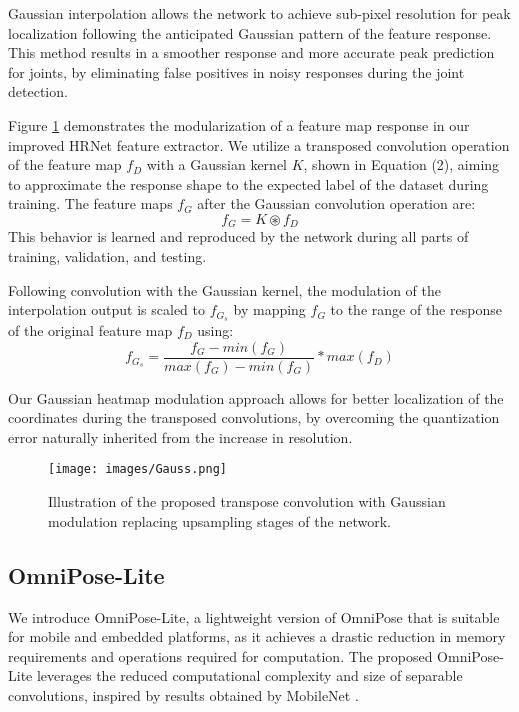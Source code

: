 \documentclass[10pt,twocolumn,letterpaper]{article}
\begin{document}
Gaussian interpolation allows the network to achieve sub-pixel resolution for peak localization following the anticipated Gaussian pattern of the feature response.
This method results in a smoother response and more accurate peak prediction for joints, by eliminating false positives in noisy responses during the joint detection.

Figure \ref{fig:Gauss} demonstrates the modularization of a feature map response in our improved HRNet feature extractor.
We utilize a transposed convolution operation of the feature map $f_D$ with a Gaussian kernel $K$, shown in Equation (2), aiming to approximate the response shape to the expected label of the dataset during training.
The feature maps $f_G$ after the Gaussian convolution operation are:
\begin{equation}
    f_G = K \circledast f_D
\end{equation}
\label{convOperation}
\noindent 
This behavior is learned and reproduced by the network during all parts of training, validation, and testing.

Following convolution with the Gaussian kernel, the modulation of the interpolation output is scaled to $f_{G_s}$ by mapping $f_{G}$ to the range of the response of the original feature map $f_{D}$ using:
\begin{equation}
    f_{G_s} = \frac{f_G - min(f_G)}{max(f_G) - min(f_G)}*max(f_D)
\end{equation}
\noindent 

Our Gaussian heatmap modulation approach allows for better localization of the coordinates during the transposed convolutions, by overcoming the quantization error naturally inherited from the increase in resolution. 


\begin{figure}[th]
\begin{center}
\texttt{[image: images/Gauss.png]}
\end{center}
  \caption{Illustration of the proposed transpose convolution with Gaussian modulation replacing upsampling stages of the network.}
\label{fig:Gauss}
\end{figure}

\subsection{OmniPose-Lite}
We introduce OmniPose-Lite, a lightweight version of OmniPose that is suitable for mobile and embedded platforms, as it achieves a drastic reduction in memory requirements and operations required for computation. The proposed OmniPose-Lite leverages the reduced computational complexity and size of separable convolutions, inspired by results obtained by MobileNet \cite{MobileNet}.
\end{document}
